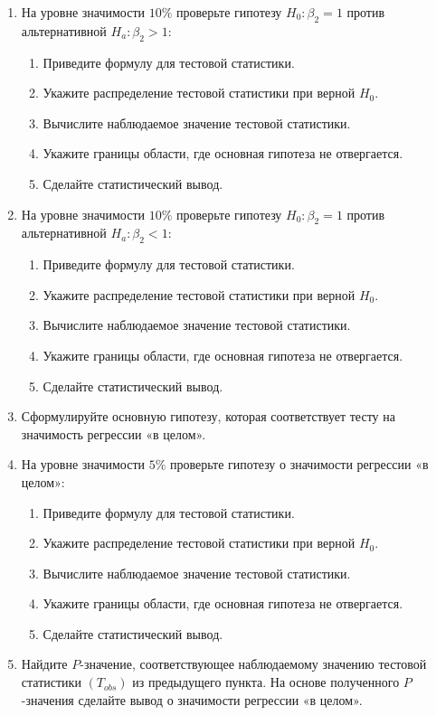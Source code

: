 \begin{problem}
\begin{enumerate}
\item На уровне значимости $10\%$ проверьте гипотезу $H_0: \beta_2 = 1$ против альтернативной $H_a: \beta_2 > 1$:
\begin{enumerate}
\item Приведите формулу для тестовой статистики.
\item Укажите распределение тестовой статистики при верной $H_0$.
\item Вычислите наблюдаемое значение тестовой статистики.
\item Укажите границы области, где основная гипотеза не отвергается.
\item Сделайте статистический вывод.
\end{enumerate}
\item На уровне значимости $10\%$ проверьте гипотезу $H_0: \beta_2 = 1$ против альтернативной $H_a: \beta_2 < 1$:
\begin{enumerate}
\item Приведите формулу для тестовой статистики.
\item Укажите распределение тестовой статистики при верной $H_0$.
\item Вычислите наблюдаемое значение тестовой статистики.
\item Укажите границы области, где основная гипотеза не отвергается.
\item Сделайте статистический вывод.
\end{enumerate}
\item Сформулируйте основную гипотезу, которая соответствует тесту на значимость регрессии «в целом».
\item На уровне значимости $5\%$ проверьте гипотезу о значимости регрессии «в целом»:
\begin{enumerate}
\item Приведите формулу для тестовой статистики.
\item Укажите распределение тестовой статистики при верной $H_0$.
\item Вычислите наблюдаемое значение тестовой статистики.
\item Укажите границы области, где основная гипотеза не отвергается.
\item Сделайте статистический вывод.
\end{enumerate}
\item Найдите $P$-значение, соответствующее наблюдаемому значению тестовой статистики $(T_{obs})$ из предыдущего пункта. На основе полученного $P$-значения сделайте вывод о значимости регрессии «в целом».

\end{enumerate}
\end{problem}
